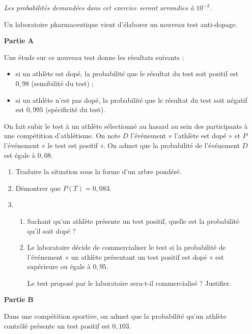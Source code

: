 \textit{Les probabilités demandées dans cet exercice seront arrondies à $10^{-3}$.}

\medskip

Un laboratoire pharmaceutique vient d’élaborer un nouveau test anti-dopage.

\medskip

\textbf{Partie A}

\medskip

Une étude sur ce nouveau test donne les résultats suivants : 

\begin{itemize}
	\item si un athlète est dopé, la probabilité que le résultat du test soit positif est $0,98$ (sensibilité du test) ; 
	\item si un athlète n’est pas dopé, la probabilité que le résultat du test soit négatif est $0,995$ (spécificité du test). 
\end{itemize}

On fait subir le test à un athlète sélectionné au hasard au sein des participants à une compétition d’athlétisme. On note $D$ l’événement « l’athlète est dopé » et $P$ l’événement « le test est positif ». On admet que la probabilité de l’événement $D$ est égale à $0,08$.

\begin{enumerate}
	\item Traduire la situation sous la forme d’un arbre pondéré. 
	\item Démontrer que $P(T)=0,083$. 
	\item 
	\begin{enumerate}
		\item Sachant qu’un athlète présente un test positif, quelle est la probabilité qu’il soit dopé ? 
		\item Le laboratoire décide de commercialiser le test si la probabilité de l’événement « un athlète présentant un test positif est dopé » est supérieure ou égale à $0,95$.
		
		Le test proposé par le laboratoire sera-t-il commercialisé ? Justifier.
	\end{enumerate}
\end{enumerate} 

\smallskip

\textbf{Partie B} 

\medskip

Dans une compétition sportive, on admet que la probabilité qu’un athlète contrôlé présente un test positif est $0,103$.

